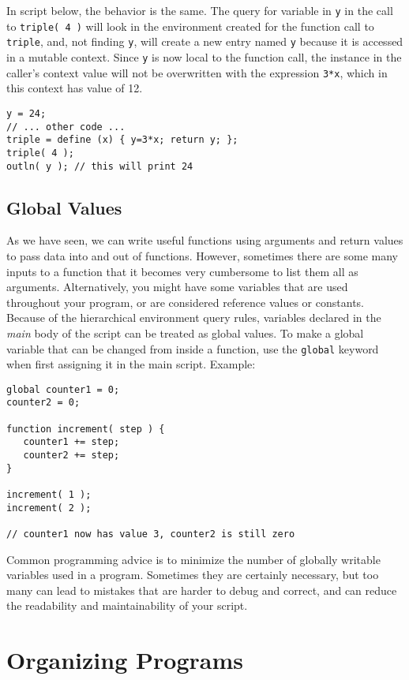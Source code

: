 \documentclass{article}
\begin{document}
In script below, the behavior is the same.  The query for variable in \texttt{y} in the call to \texttt{triple( 4 )} will look in the environment created for the function call to \texttt{triple}, and, not finding \texttt{y}, will create a new entry named \texttt{y} because it is accessed in a mutable context.  Since \texttt{y} is now local to the function call, the instance in the caller's context value will not be overwritten with the expression \texttt{3*x}, which in this context has value of 12.

\begin{verbatim}
y = 24;
// ... other code ...
triple = define (x) { y=3*x; return y; };
triple( 4 );
outln( y ); // this will print 24
\end{verbatim}


\subsection{Global Values}
As we have seen, we can write useful functions using arguments and return values to pass data into and out of functions.  However, sometimes there are some many inputs to a function that it becomes very cumbersome to list them all as arguments.  Alternatively, you might have some variables that are used throughout your program, or are considered reference values or constants.  Because of the hierarchical environment query rules, variables declared in the \emph{main} body of the script can be treated as global values.  To make a global variable that can be changed from inside a function, use the \texttt{global} keyword when first assigning it in the main script. Example:

\begin{verbatim}
global counter1 = 0;
counter2 = 0;

function increment( step ) {
   counter1 += step;
   counter2 += step;	
}

increment( 1 );
increment( 2 );

// counter1 now has value 3, counter2 is still zero
\end{verbatim}

Common programming advice is to minimize the number of globally writable variables used in a program.  Sometimes they are certainly necessary, but too many can lead to mistakes that are harder to debug and correct, and can reduce the readability and maintainability of your script.




\section{Organizing Programs}
\end{document}
